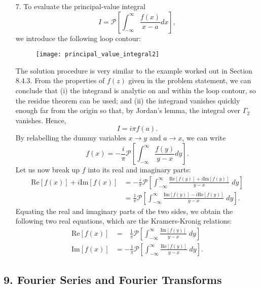 \documentclass[10pt,a4paper]{article}
\begin{document}
\begin{enumerate}
\item[7.]
To evaluate the principal-value integral
\begin{equation}
  I = \mathcal{P}\left[\int_{-\infty}^\infty \frac{f(x)}{x-a} dx \right],
\end{equation}
we introduce the following loop contour:

\begin{figure}[ht]
  \centering\texttt{[image: principal\_value\_integral2]}
\end{figure}

The solution procedure is very similar to the example worked out in
Section 8.4.3. From the properties of $f(z)$ given in the problem
statement, we can conclude that (i) the integrand is analytic on and
within the loop contour, so the residue theorem can be used; and (ii)
the integrand vanishes quickly enough far from the origin so that, by
Jordan's lemma, the integral over $\Gamma_2$ vanishes. Hence,
\begin{equation}
  I = i \pi f(a).
\end{equation}
 By relabelling the dummy variables
$x \rightarrow y$ and $a \rightarrow x$, we can write
\begin{equation}
  f(x) = -\frac{i}{\pi} \mathcal{P}\left[\int_{-\infty}^\infty \frac{f(y)}{y-x} dy \right].
\end{equation}
Let us now break up $f$ into its real and imaginary parts:
\begin{align}
  \mathrm{Re}[f(x)] + i \mathrm{Im}[f(x)]
  &= -\frac{i}{\pi} \mathcal{P}\left[\int_{-\infty}^\infty \frac{\mathrm{Re}[f(y)] + i \mathrm{Im}[f(y)]}{y-x} \;dy \right] \\
  &= \frac{1}{\pi} \mathcal{P}\left[\int_{-\infty}^\infty \frac{\mathrm{Im}[f(y)] -i\mathrm{Re}[f(y)]}{y-x} \;dy \right].
\end{align}
Equating the real and imaginary parts of the two sides, we obtain the
following two real equations, which are the Kramers-Kronig relations:
\begin{align}
  \mathrm{Re}[f(x)] &= \;\;\,\frac{1}{\pi} \mathcal{P}\left[\int_{-\infty}^\infty \frac{\mathrm{Im}[f(y)]}{y-x} \;dy \right] \\
  \mathrm{Im}[f(x)] &= -\frac{1}{\pi} \mathcal{P}\left[\int_{-\infty}^\infty \frac{\mathrm{Re}[f(y)]}{y-x} \; dy \right].
\end{align}

\end{enumerate}

\subsection*{9. Fourier Series and Fourier Transforms}
\end{document}
